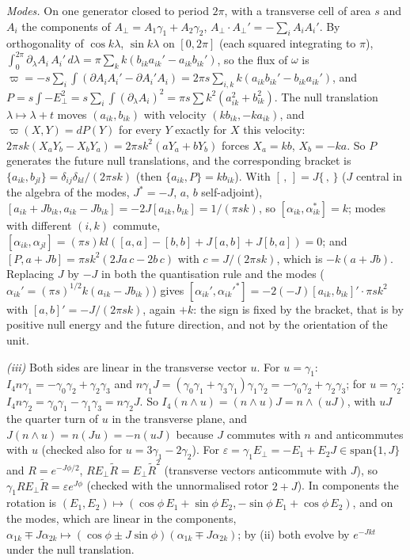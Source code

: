 \emph{Modes.} On one generator closed to period $2\pi$, with a transverse cell of area $s$ and $A_{i}$ the components of $A_{\perp} = A_{1}\gamma_{1} + A_{2}\gamma_{2}$, $A_{\perp}\cdot A_{\perp}' = -\sum_{i}A_{i}A_{i}'$. By orthogonality of $\cos k\lambda$, $\sin k\lambda$ on $[0, 2\pi]$ (each squared integrating to $\pi$), $\int_{0}^{2\pi}\partial_{\lambda}A_{i}\,A_{i}'\,d\lambda = \pi\sum_{k}k(b_{ik}a_{ik}' - a_{ik}b_{ik}')$, so the flux of $\omega$ is $\varpi = -s\sum_{i}\int(\partial A_{i}A_{i}' - \partial A_{i}'A_{i}) = 2\pi s\sum_{i,k}k(a_{ik}b_{ik}' - b_{ik}a_{ik}')$, and $P = s\int -E_{\perp}^{2} = s\sum_{i}\int(\partial_{\lambda}A_{i})^{2} = \pi s\sum k^{2}(a_{ik}^{2} + b_{ik}^{2})$. The null translation $\lambda \mapsto \lambda + t$ moves $(a_{ik}, b_{ik})$ with velocity $(kb_{ik}, -ka_{ik})$, and $\varpi(X, Y) = dP(Y)$ for every $Y$ exactly for $X$ this velocity: $2\pi sk(X_{a}Y_{b} - X_{b}Y_{a}) = 2\pi sk^{2}(aY_{a} + bY_{b})$ forces $X_{a} = kb$, $X_{b} = -ka$. So $P$ generates the future null translations, and the corresponding bracket is $\{a_{ik}, b_{jl}\} = \delta_{ij}\delta_{kl}/(2\pi sk)$ (then $\{a_{ik}, P\} = kb_{ik}$). With $[\,,\,] = J\{\,,\,\}$ ($J$ central in the algebra of the modes, $J^{*} = -J$, $a$, $b$ self-adjoint), $[a_{ik} + Jb_{ik}, a_{ik} - Jb_{ik}] = -2J[a_{ik}, b_{ik}] = 1/(\pi sk)$, so $[\alpha_{ik}, \alpha_{ik}^{*}] = k$; modes with different $(i, k)$ commute, $[\alpha_{ik}, \alpha_{jl}] = (\pi s)kl([a, a] - [b, b] + J[a, b] + J[b, a]) = 0$; and $[P, a + Jb] = \pi sk^{2}(2J a\,c - 2b\,c)$ with $c = J/(2\pi sk)$, which is $-k(a + Jb)$. Replacing $J$ by $-J$ in both the quantisation rule and the modes ($\alpha_{ik}' = (\pi s)^{1/2}k(a_{ik} - Jb_{ik})$) gives $[\alpha_{ik}', \alpha_{ik}'^{*}] = -2(-J)[a_{ik}, b_{ik}]' \cdot \pi sk^{2}$ with $[a, b]' = -J/(2\pi sk)$, again $+k$: the sign is fixed by the bracket, that is by positive null energy and the future direction, and not by the orientation of the unit.

\emph{(iii)} Both sides are linear in the transverse vector $u$. For $u = \gamma_{1}$: $I_{4}n\gamma_{1} = -\gamma_{0}\gamma_{2} + \gamma_{2}\gamma_{3}$ and $n\gamma_{1}J = (\gamma_{0}\gamma_{1} + \gamma_{3}\gamma_{1})\gamma_{1}\gamma_{2} = -\gamma_{0}\gamma_{2} + \gamma_{2}\gamma_{3}$; for $u = \gamma_{2}$: $I_{4}n\gamma_{2} = \gamma_{0}\gamma_{1} - \gamma_{1}\gamma_{3} = n\gamma_{2}J$. So $I_{4}(n\wedge u) = (n\wedge u)J = n\wedge(uJ)$, with $uJ$ the quarter turn of $u$ in the transverse plane, and $J(n\wedge u) = n(Ju) = -n(uJ)$ because $J$ commutes with $n$ and anticommutes with $u$ (checked also for $u = 3\gamma_{1} - 2\gamma_{2}$). For $\varepsilon = \gamma_{1}E_{\perp} = -E_{1} + E_{2}J \in \mathrm{span}\{1, J\}$ and $R = e^{-J\phi/2}$, $RE_{\perp}\tilde R = E_{\perp}\tilde R^{2}$ (transverse vectors anticommute with $J$), so $\gamma_{1}RE_{\perp}\tilde R = \varepsilon e^{J\phi}$ (checked with the unnormalised rotor $2 + J$). In components the rotation is $(E_{1}, E_{2}) \mapsto (\cos\phi\,E_{1} + \sin\phi\,E_{2}, -\sin\phi\,E_{1} + \cos\phi\,E_{2})$, and on the modes, which are linear in the components, $\alpha_{1k} \mp J\alpha_{2k} \mapsto (\cos\phi \pm J\sin\phi)(\alpha_{1k} \mp J\alpha_{2k})$; by (ii) both evolve by $e^{-Jkt}$ under the null translation.


